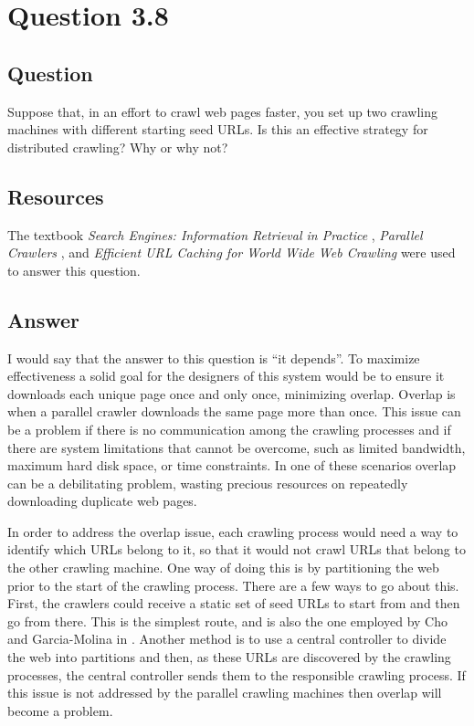 \section{Question 3.8}

\subsection{Question}
Suppose that, in an effort to crawl web pages faster, you set up two crawling machines with different starting seed URLs. Is this an effective strategy for distributed crawling? Why or why not?

\subsection{Resources}
The textbook \textit{Search Engines: Information Retrieval in Practice} \cite{seirip}, \textit{Parallel Crawlers} \cite{Cho:2002:PC:511446.511464}, and \textit{Efficient URL Caching for World Wide Web Crawling} \cite{Broder:2003:EUC:775152.775247} were used to answer this question.


\subsection{Answer}
I would say that the answer to this question is ``it depends''.  To maximize effectiveness a solid goal for the designers of this system would be to ensure it downloads each unique page once and only once, minimizing overlap.  Overlap is when a parallel crawler downloads the same page more than once.  This issue can be a problem if there is no communication among the crawling processes and if there are system limitations that cannot be overcome, such as limited bandwidth, maximum hard disk space, or time constraints.  In one of these scenarios overlap can be a debilitating problem, wasting precious resources on repeatedly downloading duplicate web pages.

In order to address the overlap issue, each crawling process would need a way to identify which URLs belong to it, so that it would not crawl URLs that belong to the other crawling machine.  One way of doing this is by partitioning the web prior to the start of the crawling process.  There are a few ways to go about this.  First, the crawlers could receive a static set of seed URLs to start from and then go from there.  This is the simplest route, and is also the one employed by Cho and Garcia-Molina in \cite{Cho:2002:PC:511446.511464}.  Another method is to use a central controller to divide the web into partitions and then, as these URLs are discovered by the crawling processes, the central controller sends them to the responsible crawling process.  If this issue is not addressed by the parallel crawling machines then overlap will become a problem.

